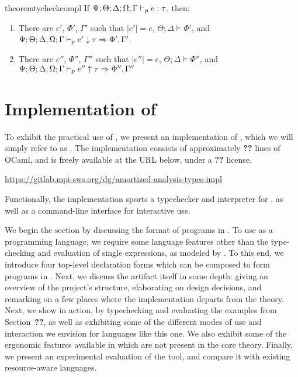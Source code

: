 \begin{restatable}{theorem}{tycheckcompl}
\label{thm:tycheck-compl}
If $\Psi;\Theta;\Delta;\Omega;\Gamma \vdash_p e : \tau$, then:
\begin{enumerate}
  \item There are $e'$, $\Phi'$, $\Gamma'$ such that $|e'| = e$, $\Theta ; \Delta \vDash \Phi'$, and $\Psi;\Theta;\Delta;\Omega;\Gamma \vdash_p e' \downarrow \tau \Rightarrow \Phi', \Gamma'$.
  \item There are $e''$, $\Phi''$, $\Gamma''$ such that $|e''| = e$, $\Theta ; \Delta \vDash \Phi''$, and $\Psi;\Theta;\Delta;\Omega;\Gamma \vdash_p e'' \uparrow \tau \Rightarrow \Phi'',\Gamma''$
\end{enumerate}
\end{restatable}


\section{Implementation of \lambdaamor}
\label{sec:lambdaamor-impl}
To exhibit the practical use of \dlambdaamor, we present an implementation of \bilambdaamor, which we will simply refer to as \lambdaamorimpl. The implementation consists of approximately \textbf{??} lines of OCaml, and is freely available at the URL below, under a \textbf{??} license.
\begin{center}
\url{https://gitlab.mpi-sws.org/dg/amortized-analysis-types-impl}
\end{center}
Functionally, the implementation sports a typechecker and interpreter for \dlambdaamor, as well as a command-line interface for interactive use.

We begin the section by discussing the format of programs in \lambdaamorimpl. To use \lambdaamorimpl as a programming language, we require some language features other than the type-checking and evaluation of single expressions, as modeled by \bilambdaamor. To this end, we introduce four top-level declaration forms which can be composed to form programs in \lambdaamorimpl. Next, we discuss the artifact itself in some depth: giving an overview of the project's structure, elaborating on design decisions, and remarking on a few places where the implementation departs from the theory.
 Next, we show \lambdaamorimpl in action, by typechecking and evaluating the examples from Section~\textbf{??}, as well as exhibiting some of the different modes of use and interaction we envision for languages like this one. We also exhibit some of the ergonomic features available in \lambdaamorimpl which are not present in the core theory. Finally, we present an experimental evaluation of the tool, and compare it with existing resource-aware languages.
 

